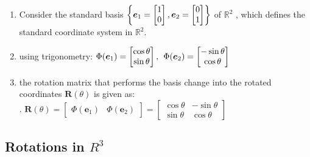 \begin{enumerate}
    \item Consider the standard basis 
    $
        \left\{
            \bm{e}_1 = \begin{bmatrix}1\\0\end{bmatrix}, 
            \bm{e}_2 = \begin{bmatrix}0\\1\end{bmatrix}
        \right\}
    $ of $\mathbb{R}^2$ , which defines the standard coordinate system in $\mathbb{R}^2$.
    \hfill \cite{mfml/book/mml/Deisenroth-Faisal-Ong}

    \item using trigonometry:
    $
        \Phi(\bm{e}_1) = \begin{bmatrix}\cos \theta\\\sin \theta\end{bmatrix},
        \hspace{0.15cm}
        \Phi(\bm{e}_2) = \begin{bmatrix}-\sin \theta\\\cos \theta\end{bmatrix}
    $
    \hfill \cite{mfml/book/mml/Deisenroth-Faisal-Ong}

    \item the rotation matrix that performs the basis change into the rotated coordinates $\bm{R}(\theta)$ is given as:
    \hfill \cite{mfml/book/mml/Deisenroth-Faisal-Ong}
    \\
    .\hfill
    $
        \bm{R}(\theta)
        = \begin{bmatrix}
            \Phi(\bm{e}_1) & \Phi(\bm{e}_2)
        \end{bmatrix}
        = \begin{bmatrix}
            \cos\theta & -\sin\theta \\
            \sin\theta & \cos\theta
        \end{bmatrix}
    $
    \hfill \cite{mfml/book/mml/Deisenroth-Faisal-Ong}
\end{enumerate}


\subsection{Rotations in $R^3$}


